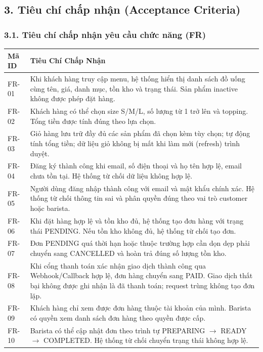 \documentclass[11pt,a4paper]{article}
\begin{document}
\subsection*{3. Tiêu chí chấp nhận (Acceptance Criteria)}
\label{sec:acceptance-criteria}

\subsubsection*{3.1. Tiêu chí chấp nhận yêu cầu chức năng (FR)}

\begin{longtable}[]{@{}
  >{\raggedright\arraybackslash}p{}
  >{\raggedright\arraybackslash}p{}@{}}
\toprule
\textbf{Mã ID} & \textbf{Tiêu Chí Chấp Nhận} \\
\midrule
\endhead
\bottomrule
\endlastfoot
FR-01 & Khi khách hàng truy cập menu, hệ thống hiển thị danh sách đồ uống cùng tên, giá, danh mục, tồn kho và trạng thái. Sản phẩm inactive không được phép đặt hàng. \\
FR-02 & Khách hàng có thể chọn size S/M/L, số lượng từ 1 trở lên và topping. Tổng tiền được tính đúng theo lựa chọn. \\
FR-03 & Giỏ hàng lưu trữ đầy đủ các sản phẩm đã chọn kèm tùy chọn; tự động tính tổng tiền; dữ liệu giỏ không bị mất khi làm mới (refresh) trình duyệt. \\
FR-04 & Đăng ký thành công khi email, số điện thoại và họ tên hợp lệ, email chưa tồn tại. Hệ thống từ chối dữ liệu không hợp lệ. \\
FR-05 & Người dùng đăng nhập thành công với email và mật khẩu chính xác. Hệ thống từ chối thông tin sai và phân quyền đúng theo vai trò customer hoặc barista. \\
FR-06 & Khi đặt hàng hợp lệ và tồn kho đủ, hệ thống tạo đơn hàng với trạng thái PENDING. Nếu tồn kho không đủ, hệ thống từ chối tạo đơn. \\
FR-07 & Đơn PENDING quá thời hạn hoặc thuộc trường hợp cần dọn dẹp phải chuyển sang CANCELLED và hoàn trả đúng số lượng tồn kho. \\
FR-08 & Khi cổng thanh toán xác nhận giao dịch thành công qua Webhook/Callback hợp lệ, đơn hàng chuyển sang PAID. Giao dịch thất bại không được ghi nhận là đã thanh toán; request trùng không tạo đơn lặp. \\
FR-09 & Khách hàng chỉ xem được đơn hàng thuộc tài khoản của mình. Barista có quyền xem danh sách đơn hàng theo quyền được cấp. \\
FR-10 & Barista có thể cập nhật đơn theo trình tự PREPARING $\rightarrow$ READY $\rightarrow$ COMPLETED. Hệ thống từ chối chuyển trạng thái không hợp lệ. \\

\end{longtable}
\end{document}
